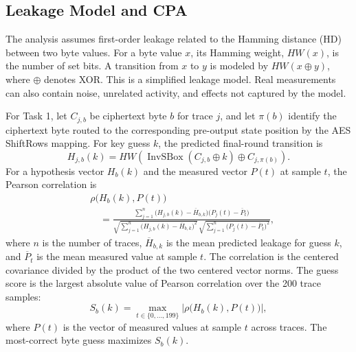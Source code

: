 \documentclass[conference,10pt,letterpaper]{IEEEtran}
\begin{document}
\subsection{Leakage Model and CPA}
The analysis assumes first-order leakage related to the Hamming distance (HD) between two byte values. For a byte value $x$, its Hamming weight, $HW(x)$, is the number of set bits. A transition from $x$ to $y$ is modeled by $HW(x\oplus y)$, where $\oplus$ denotes XOR. This is a simplified leakage model. Real measurements can also contain noise, unrelated activity, and effects not captured by the model.

For Task 1, let $C_{j,b}$ be ciphertext byte $b$ for trace $j$, and let $\pi(b)$ identify the ciphertext byte routed to the corresponding pre-output state position by the AES ShiftRows mapping. For key guess $k$, the predicted final-round transition is
\begin{equation}
H_{j,b}(k)=HW\!\left(\operatorname{InvSBox}(C_{j,b}\oplus k)\oplus C_{j,\pi(b)}\right).
\label{eq:task1-hypothesis}
\end{equation}
For a hypothesis vector $H_b(k)$ and the measured vector $P(t)$ at sample $t$, the Pearson correlation is~\cite{oflynn2014}
\begin{equation}
\begin{aligned}
&\rho\big(H_b(k),P(t)\big)\\
&\quad=\frac{\displaystyle\sum_{j=1}^{n}\big(H_{j,b}(k)-\overline{H}_{b,k}\big)\big(P_j(t)-\overline{P}_t\big)}
{\displaystyle\sqrt{\sum_{j=1}^{n}\big(H_{j,b}(k)-\overline{H}_{b,k}\big)^2}\,
\displaystyle\sqrt{\sum_{j=1}^{n}\big(P_j(t)-\overline{P}_t\big)^2}},
\end{aligned}
\label{eq:pearson}
\end{equation}
where $n$ is the number of traces, $\overline{H}_{b,k}$ is the mean predicted leakage for guess $k$, and $\overline{P}_t$ is the mean measured value at sample $t$. The correlation is the centered covariance divided by the product of the two centered vector norms.
The guess score is the largest absolute value of Pearson correlation over the 200 trace samples:
\begin{equation}
S_b(k)=\max_{t\in\{0,\ldots,199\}}\left|\rho\big(H_b(k),P(t)\big)\right|,
\label{eq:task1-score}
\end{equation}
where $P(t)$ is the vector of measured values at sample $t$ across traces. The most-correct byte guess maximizes $S_b(k)$.
\end{document}
